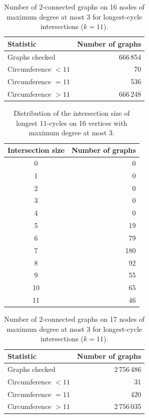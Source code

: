 \begin{table}[ht]
\centering
\caption{Number of 2-connected graphs on 16 nodes of maximum degree at most 3 for longest-cycle intersections ($k=11$).}
\label{tab:summary-geng-2con-n16}
\begin{tabular}{lr}
\toprule
Statistic & Number of graphs \\
\midrule
Graphs checked & 666\,854 \\
Circumference $<11$ & 70 \\
Circumference $=11$ & 536 \\
Circumference $>11$ & 666\,248 \\
\bottomrule
\end{tabular}
\end{table}


\begin{table}[ht]
\centering
\caption{Distribution of the intersection size of longest $11$-cycles on 16 vertices with maximum degree at most 3.}
\label{tab:intersection-d16d3}
\begin{tabular}{cr}
\toprule
Intersection size & Number of graphs \\
\midrule
0 & 0 \\
1 & 0 \\
2 & 0 \\
3 & 0 \\
4 & 0 \\
5 & 19 \\
6 & 79 \\
7 & 180 \\
8 & 92 \\
9 & 55 \\
10 & 65 \\
11 & 46 \\
\bottomrule
\end{tabular}
\end{table}

\begin{table}[ht]
\centering
\caption{Number of 2-connected graphs on 17 nodes of maximum degree at most 3 for longest-cycle intersections ($k=11$).}
\label{tab:summary-geng-2con-n17}
\begin{tabular}{lr}
\toprule
Statistic & Number of graphs \\
\midrule
Graphs checked & 2\,756\,486 \\
Circumference $<11$ & 31 \\
Circumference $=11$ & 420 \\
Circumference $>11$ & 2\,756\,035 \\
\bottomrule
\end{tabular}
\end{table}


